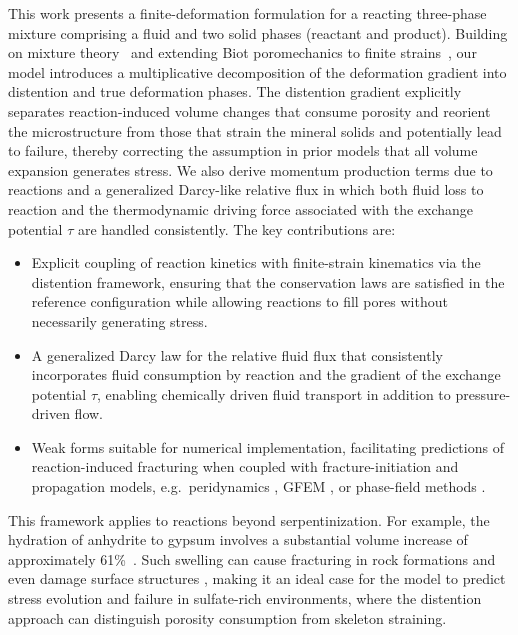 \documentclass[11pt]{article}
\begin{document}
This work presents a finite-deformation formulation for a reacting three-phase mixture comprising a fluid and two solid phases (reactant and product). Building on mixture theory~\cite{drumheller2000} and extending Biot poromechanics to finite strains~\cite{foster2025}, our model introduces a multiplicative decomposition of the deformation gradient into distention and true deformation phases. The distention gradient explicitly separates reaction-induced volume changes that consume porosity and reorient the microstructure from those that strain the mineral solids and potentially lead to failure, thereby correcting the assumption in prior models that all volume expansion generates stress. We also derive momentum production terms due to reactions and a generalized Darcy-like relative flux in which both fluid loss to reaction and the thermodynamic driving force associated with the exchange potential $\tau$ are handled consistently. The key contributions are:
\begin{itemize}
    \item Explicit coupling of reaction kinetics with finite-strain kinematics via the distention framework, ensuring that the conservation laws are satisfied in the reference configuration while allowing reactions to fill pores without necessarily generating stress.
    \item A generalized Darcy law for the relative fluid flux that consistently incorporates fluid consumption by reaction and the gradient of the exchange potential $\tau$, enabling chemically driven fluid transport in addition to pressure-driven flow.
    \item Weak forms suitable for numerical implementation, facilitating predictions of reaction-induced fracturing when coupled with fracture-initiation and propagation models, e.g.\ peridynamics \cite{agrawal2020coupling}, GFEM \cite{duarte2008analysis}, or phase-field methods \cite{wilson2016phase}.
\end{itemize}

This framework applies to reactions beyond serpentinization. For example, the hydration of anhydrite to gypsum involves a substantial volume increase of approximately 61\%~\cite{butscher2011}. Such swelling can cause fracturing in rock formations and even damage surface structures \cite{Sass_2010}, making it an ideal case for the model to predict stress evolution and failure in sulfate-rich environments, where the distention approach can distinguish porosity consumption from skeleton straining.
\end{document}
